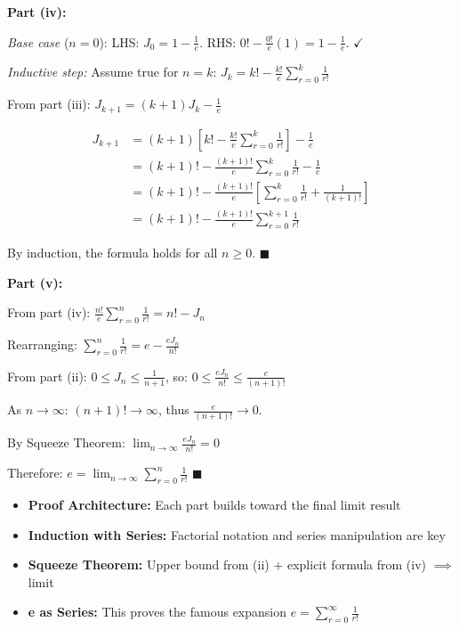 \begin{solution}[Parts (iv), (v)]
\textbf{Part (iv):}

\textit{Base case} ($n=0$): LHS: $J_0 = 1 - \frac{1}{e}$. RHS: $0! - \frac{0!}{e}(1) = 1 - \frac{1}{e}$. $\checkmark$

\textit{Inductive step:} Assume true for $n=k$: $J_k = k! - \frac{k!}{e} \sum_{r=0}^{k} \frac{1}{r!}$

From part (iii): $J_{k+1} = (k+1)J_k - \frac{1}{e}$

\begin{align*}
J_{k+1} &= (k+1)\left[ k! - \frac{k!}{e} \sum_{r=0}^{k} \frac{1}{r!} \right] - \frac{1}{e} \\
&= (k+1)! - \frac{(k+1)!}{e} \sum_{r=0}^{k} \frac{1}{r!} - \frac{1}{e} \\
&= (k+1)! - \frac{(k+1)!}{e} \left[ \sum_{r=0}^{k} \frac{1}{r!} + \frac{1}{(k+1)!} \right] \\
&= \boxed{(k+1)! - \frac{(k+1)!}{e} \sum_{r=0}^{k+1} \frac{1}{r!}}
\end{align*}

By induction, the formula holds for all $n \ge 0$. $\blacksquare$

\textbf{Part (v):}

From part (iv): $\frac{n!}{e} \sum_{r=0}^{n} \frac{1}{r!} = n! - J_n$

Rearranging: $\sum_{r=0}^{n} \frac{1}{r!} = e - \frac{eJ_n}{n!}$

From part (ii): $0 \le J_n \le \frac{1}{n+1}$, so: $0 \le \frac{eJ_n}{n!} \le \frac{e}{(n+1)!}$

As $n \to \infty$: $(n+1)! \to \infty$, thus $\frac{e}{(n+1)!} \to 0$.

By Squeeze Theorem: $\lim_{n \to \infty} \frac{eJ_n}{n!} = 0$

Therefore: $\boxed{e = \lim_{n \to \infty} \sum_{r=0}^{n} \frac{1}{r!}}$ $\blacksquare$
\end{solution}

\begin{takeaways}
\begin{itemize}
\item \textbf{Proof Architecture:} Each part builds toward the final limit result
\item \textbf{Induction with Series:} Factorial notation and series manipulation are key
\item \textbf{Squeeze Theorem:} Upper bound from (ii) + explicit formula from (iv) $\implies$ limit
\item \textbf{e as Series:} This proves the famous expansion $e = \sum_{r=0}^{\infty} \frac{1}{r!}$
\end{itemize}
\end{takeaways}

